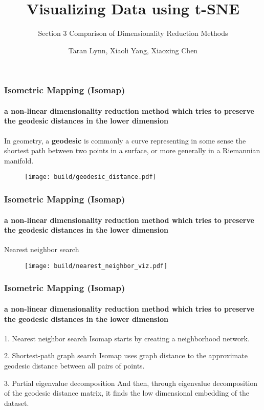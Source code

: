 \documentclass{beamer}
\title{Visualizing Data using t-SNE}
\subtitle{Section 3 Comparison of Dimensionality Reduction Methods}
\author{Taran Lynn, Xiaoli Yang, Xiaoxing Chen}
\begin{document}
\maketitle

% 
% 
% 
%

\begin{frame}
  \frametitle{Isometric Mapping (Isomap)}
  \framesubtitle{a non-linear dimensionality reduction method which tries to preserve the geodesic distances in the lower dimension}

  In geometry, a \textbf{geodesic} is commonly a curve representing in some sense the shortest path 
  between two points in a surface, or more generally in a Riemannian manifold.
  \begin{figure}
    \centering
    \texttt{[image: build/geodesic\_distance.pdf]}
  \end{figure}

\end{frame}

\begin{frame}
  \frametitle{Isometric Mapping (Isomap)}
  \framesubtitle{a non-linear dimensionality reduction method which tries to preserve the geodesic distances in the lower dimension}

  Nearest neighbor search
  \begin{figure}
    \centering
    \texttt{[image: build/nearest\_neighbor\_viz.pdf]}
  \end{figure}

\end{frame}

\begin{frame}
  \frametitle{Isometric Mapping (Isomap)}
  \framesubtitle{a non-linear dimensionality reduction method which tries to preserve the geodesic distances in the lower dimension}

  \begin{block}{1. Nearest neighbor search}
    Isomap starts by creating a neighborhood network.
  \end{block}

  \begin{block}{2. Shortest-path graph search}
    Isomap uses graph distance to the approximate geodesic distance between all pairs of points.
  \end{block}

  \begin{block}{3. Partial eigenvalue decomposition}
    And then, through eigenvalue decomposition of the geodesic distance matrix, it finds the low dimensional embedding of the dataset.
  \end{block}
  

\end{frame}
\end{document}
